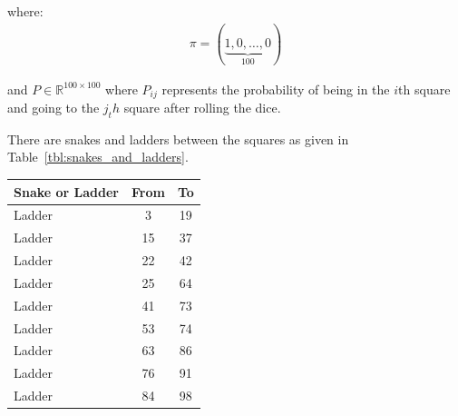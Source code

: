 where:
\begin{equation*}
\begin{split}
\pi = (\underbrace{1, 0, \dots, 0}_{100})
\end{split}
\end{equation*}

and \(P\in\mathbb{R}^{100 \times 100}\) where \(P_{ij}\) represents the probability
of being in the \(i\)th square and going to the \(j_th\) square after rolling the
dice.


There are snakes and ladders between the squares as given in
Table~\ref{tbl:snakes_and_ladders}.


\begin{table}[!hbtp]
\begin{tabular}{l|c|c}
\hline

Snake or Ladder
&

From
&

To
\\
\midrule

Ladder
&

3
&

19
\\
Ladder
&

15
&

37
\\

Ladder
&

22
&

42
\\

Ladder
&

25
&

64
\\

Ladder
&

41
&

73
\\

Ladder
&

53
&

74
\\

Ladder
&

63
&

86
\\

Ladder
&

76
&

91
\\

Ladder
&

84
&

98
\\


\end{tabular}
\end{table}
